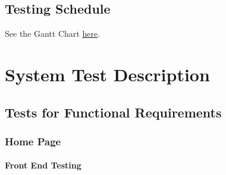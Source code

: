 \documentclass[12pt, titlepage]{article}
\begin{document}
\subsection{Testing Schedule}
		
See the Gantt Chart \href{https://gitlab.cas.mcmaster.ca/webapp/webapp_l02_grp15/-/tree/main/ProjectSchedule}{here}.

\section{System Test Description}

\subsection{Tests for Functional Requirements}

\subsubsection{Home Page}
		
\paragraph{Front End Testing}
\end{document}
